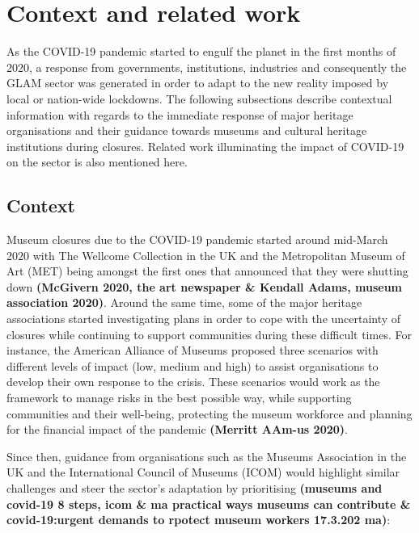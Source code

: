 \documentclass{egpubl}
\begin{document}
\section{Context and related work}
As the COVID-19 pandemic started to engulf the planet in the first months of 2020, a response from governments, institutions, industries and consequently the GLAM sector was generated in order to adapt to the new reality imposed by local or nation-wide lockdowns. The following subsections describe contextual information with regards to the immediate response of major heritage organisations and their guidance towards museums and cultural heritage institutions during closures. Related work illuminating the impact of COVID-19 on the sector is also mentioned here.

\subsection{Context}
Museum closures due to the COVID-19 pandemic started around mid-March 2020 with The Wellcome Collection in the UK and the Metropolitan Museum of Art (MET) being amongst the first ones that announced that they were shutting down \textbf{(McGivern 2020, the art newspaper \& Kendall Adams, museum association 2020)}. Around the same time, some of the major heritage  associations started investigating plans in order to cope with the uncertainty of closures while continuing to support communities during these difficult times. For instance, the American Alliance of Museums proposed three scenarios with different levels of impact (low, medium and high) to assist organisations to develop their own response to the crisis. These scenarios would work as the framework to manage risks in the best possible way, while supporting communities and their well-being, protecting the museum workforce and planning for the financial impact of the pandemic \textbf{(Merritt AAm-us 2020)}.

Since then, guidance from organisations such as the Museums Association in the UK and the International Council of Museums (ICOM) would highlight similar challenges and steer the sector's adaptation by prioritising \textbf{(museums and covid-19 8 steps, icom \& ma practical ways museums can contribute \& covid-19:urgent demands to rpotect museum workers 17.3.202 ma)}:
\end{document}
